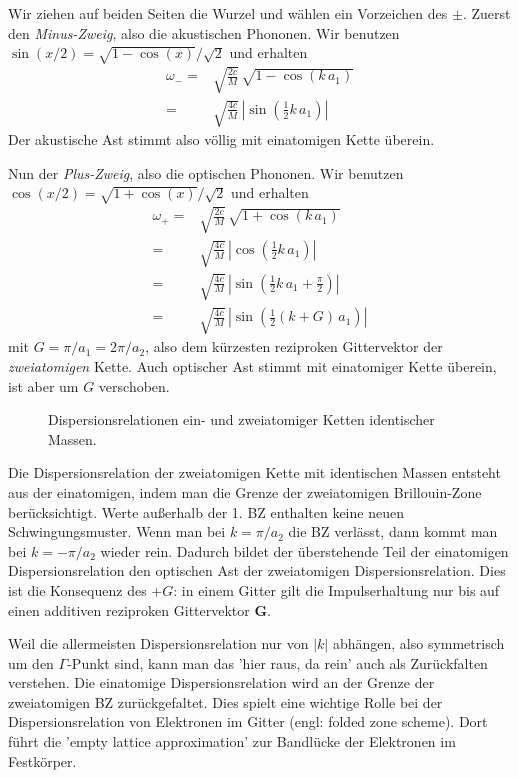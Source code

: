 Wir ziehen auf beiden Seiten die Wurzel und wählen ein Vorzeichen des $\pm$.
Zuerst den \emph{Minus-Zweig}, also die akustischen Phononen. Wir benutzen  $\sin(x/2) = \sqrt{ 1-\cos(x) } / \sqrt{2}$ und erhalten
\begin{align}
\omega_{-} =  & \sqrt{\frac{2c}{M}} \, \sqrt{1 - 
  \cos \left(   k \, a_1 \right) }  \\
=  & \sqrt{\frac{4c}{M}} \, 
 \left|  \sin \left( \frac{1}{2}   k \, a_1 \right) \right|
\end{align}
Der akustische Ast stimmt  also völlig mit einatomigen Kette überein.

Nun der\emph{ Plus-Zweig}, also die optischen Phononen. Wir benutzen $\cos(x/2) = \sqrt{ 1+\cos(x) } / \sqrt{2}$ und erhalten
\begin{align}
\omega_{+} =  & \sqrt{\frac{2c}{M}} \, \sqrt{1 + 
  \cos \left(   k \, a_1 \right) }  \\
=  & \sqrt{\frac{4c}{M}} \, 
\left|  \cos \left( \frac{1}{2}   k \, a_1 \right) \right| \\
  =  & \sqrt{\frac{4c}{M}} \, 
\left|  \sin \left( \frac{1}{2}   k \, a_1 + \frac{\pi}{2} \right)  \right| \\
    =  & \sqrt{\frac{4c}{M}} \, 
\left|  \sin \left( \frac{1}{2}   (k + G)  \, a_1 \right)  \right|
\end{align}
mit $G   =\pi / a_1 = 2 \pi / a_2$, also dem kürzesten reziproken Gittervektor der \emph{zweiatomigen} Kette. Auch optischer Ast stimmt mit einatomiger Kette überein, ist aber um $G$ verschoben. 




  \begin{figure}
\caption{Dispersionsrelationen ein- und zweiatomiger Ketten identischer Massen.}
  \end{figure}

Die Dispersionsrelation der zweiatomigen Kette mit identischen Massen entsteht aus der einatomigen,  indem man die Grenze der zweiatomigen Brillouin-Zone berücksichtigt. Werte außerhalb der 1. BZ enthalten keine neuen Schwingungsmuster. Wenn man bei $k=\pi/a_2$ die BZ verlässt, dann kommt man bei $k = - \pi/a_2$ wieder rein. Dadurch bildet der überstehende Teil der einatomigen Dispersionsrelation den optischen Ast der zweiatomigen Dispersionsrelation. Dies ist die Konsequenz des $+G$: in einem Gitter gilt die Impulserhaltung nur bis auf einen additiven reziproken Gittervektor $\mathbf{G}$.

Weil die allermeisten Dispersionsrelation nur von $|k|$ abhängen, also symmetrisch um den $\Gamma$-Punkt sind, kann man das 'hier raus, da rein' auch als 
Zurückfalten verstehen. Die einatomige Dispersionsrelation wird an der Grenze der zweiatomigen BZ zurückgefaltet.
 Dies spielt eine wichtige Rolle bei der Dispersionsrelation von Elektronen im Gitter (engl: folded zone scheme). Dort führt die 'empty lattice approximation'  zur Bandlücke der Elektronen im Festkörper.
 
